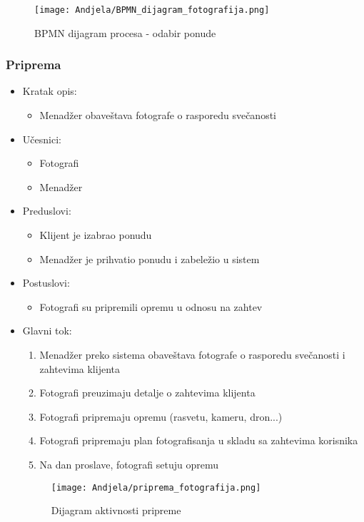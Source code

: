 \documentclass[a4paper]{article}
\begin{document}
\begin{itemize}
    \begin{figure}[H]
    \centering
    \texttt{[image: Andjela/BPMN\_dijagram\_fotografija.png]}
    \caption{BPMN dijagram procesa - odabir ponude}
    \label{fig:RegistracijaZ}
\end{figure}
        
\end{itemize}

\subsubsection{Priprema}
\begin{itemize}
    \item Kratak opis: 
    \begin{itemize}
        \item Menadžer obaveštava fotografe o rasporedu svečanosti
    \end{itemize}
    \item Učesnici:
        \begin{itemize}
        \item Fotografi
        \item Menadžer
    \end{itemize}
    \item Preduslovi:
        \begin{itemize}
            \item Klijent je izabrao ponudu
            \item Menadžer je prihvatio ponudu i zabeležio u sistem
        \end{itemize}
    \item Postuslovi:
        \begin{itemize}
            \item Fotografi su pripremili opremu u odnosu na zahtev
        \end{itemize}
    \item Glavni tok:
        \begin{enumerate}
            \item Menadžer preko sistema obaveštava fotografe o rasporedu svečanosti i zahtevima klijenta
            \item Fotografi preuzimaju detalje o zahtevima klijenta
            \item Fotografi pripremaju opremu (rasvetu, kameru, dron...)
            \item Fotografi pripremaju plan fotografisanja u skladu sa zahtevima korisnika
            \item Na dan proslave, fotografi setuju opremu
        \end{enumerate}
        
        \begin{figure}[H]
    \centering
\texttt{[image: Andjela/priprema\_fotografija.png]}
    \caption{Dijagram aktivnosti pripreme}
    \label{fig:RegistracijaZ}
\end{figure}
        
        
\end{itemize}
\end{document}
